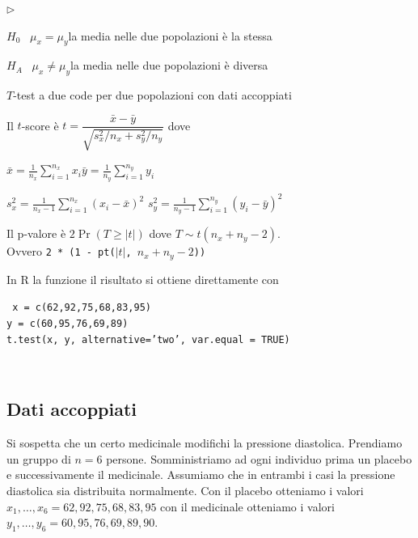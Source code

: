 \documentclass[12pt,openany]{book}
\newcommand{\mylabel}[1]{{\footnotesize\textsf{#1}}\hfill}
\renewenvironment{itemize}
  {\begin{list}{$\triangleright$}{%
   \setlength{\parskip}{0mm}
   \setlength{\topsep}{.2\baselineskip}
   \setlength{\rightmargin}{0mm}
   \setlength{\listparindent}{0mm}
   \setlength{\itemindent}{0mm}
   \setlength{\labelwidth}{3ex}
   \setlength{\itemsep}{.4\baselineskip}
   \setlength{\parsep}{0mm}
   \setlength{\partopsep}{0mm}
   \setlength{\labelsep}{1ex}
   \setlength{\leftmargin}{\labelwidth+\labelsep}
   \let\makelabel\mylabel}}{%
   \end{list}\vspace*{-1.3mm}}
\theoremstyle{mio}
\theoremstyle{liscio}
\begin{document}
\begin{itemize}
\item[1.] $H_0$ \ $\mu_x = \mu_y$\hfill la media nelle due popolazioni è la stessa 

\item[2.] $H_A$ \ $\mu_x\neq\mu_y$\hfill la media nelle due popolazioni è diversa 


\item[3.] $T$-test a due code per due popolazioni con dati accoppiati

\item[3.] Il $t$-score è 
$t = \dfrac{\bar x - \bar y}{\sqrt{s^2_x/n_x+s^2_y/n_y}}$ dove 

$\displaystyle\bar x = \frac1{n_x}\sum^{n_x}_{i=1}x_i$\hfil$\displaystyle\bar y = \frac1{n_y}\sum^{n_y}_{i=1}y_i$


$\displaystyle s^2_x= \frac1{n_x-1}\sum^{n_x}_{i=1}(x_i-\bar x)^2$\hfil
$\displaystyle s^2_y= \frac1{n_y-1}\sum^{n_y}_{i=1}(y_i-\bar y)^2$




\item[4.] Il p-valore è $2\Pr(T\ge |t|)$ dove $T\sim t(n_x+n_y-2)$.\\ 
Ovvero {\tt 2 * (1 - pt($|t|$, $n_x+n_y-2$))}

\hrulefill\hfill\hfill

In R la funzione il risultato si ottiene direttamente con

{\tt 
x = c(62,92,75,68,83,95)\\
y = c(60,95,76,69,89)\\
t.test(x, y, alternative='two', var.equal = TRUE)}
\end{itemize}

\hfill{}\clearpage\
\subsection{Dati accoppiati}

Si sospetta che un certo medicinale modifichi la pressione diastolica.  Prendiamo un gruppo di $n=6$ persone. Somministriamo ad ogni individuo prima un placebo e successivamente il medicinale. Assumiamo che in entrambi i casi la pressione diastolica sia distribuita normalmente. Con il placebo otteniamo i valori $x_1,\dots,x_6=62,92,75,68,83,95$ con il medicinale otteniamo i valori $y_1,\dots,y_6=60,95,76,69,89,90$.
\end{document}
